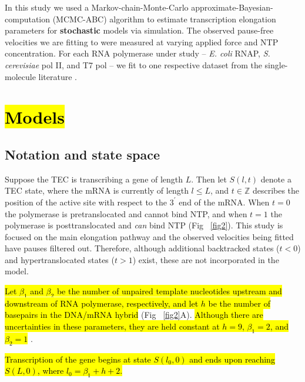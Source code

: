 \documentclass[10pt,letterpaper]{article}
\begin{document}
In this study we used a Markov-chain-Monte-Carlo approximate-Bayesian-computation (MCMC-ABC) algorithm \cite{beaumont2010approximate} to estimate transcription elongation parameters for \textbf{stochastic} models via simulation. The observed pause-free velocities we are fitting to were measured at varying applied force and NTP concentration. For each RNA polymerase under study -- \textit{ E. coli} RNAP, \textit{ S. cerevisiae} pol II, and T7 pol -- we fit to one respective dataset from the single-molecule literature \cite{abbondanzieri2005direct,schweikhard2014transcription,thomen2008t7}.




\section*{\hl{Models}}



\subsection*{Notation and state space}


Suppose the TEC is transcribing a gene of length $L$. Then let $S(l, t)$ denote a TEC state, where the mRNA is currently of length $l \leq L$, and $t \in \mathbb{Z}$ describes the position of the active site with respect to the $3^\prime$ end of the mRNA. When $t=0$ the polymerase is pretranslocated and cannot bind NTP, and when $t=1$ the polymerase is posttranslocated and \textit{can} bind NTP  (Fig ~\ref{fig2}). This study is focused on the main elongation pathway and the observed velocities being fitted have pauses filtered out. Therefore, although additional backtracked states ($t < 0$) \cite{wang1998force, shaevitz2003backtracking, abbondanzieri2005direct} and hypertranslocated states ($t > 1$) \cite{artsimovitch2000pausing, zhou2007dissociation} exist, these are not incorporated in the model.

\hl{Let $\beta_1$ and $\beta_2$ be the number of unpaired template nucleotides upstream and downstream of RNA polymerase, respectively, and let $h$ be the number of basepairs in the DNA/mRNA hybrid } (Fig ~\ref{fig2}A). \hl{ Although there are uncertainties in these parameters, they are held constant at $h = 9$, $\beta_1 = 2$, and $\beta_2 = 1$ } \cite{greive2005thinking, maoileidigh2011unified}.

\hl{ Transcription of the gene begins at state $S(l_0,0)$ and ends upon reaching $S(L, 0)$, where $l_0 = \beta_1 + h + 2$.}
\end{document}
